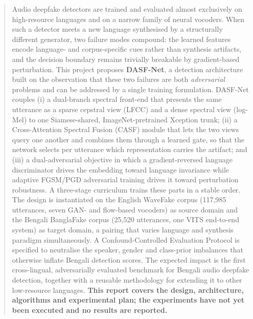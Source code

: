 \documentclass[conference]{IEEEtran}
\begin{document}
\maketitle

\begin{abstract}
Audio deepfake detectors are trained and evaluated almost exclusively on
high-resource languages and on a narrow family of neural vocoders. When such a
detector meets a new language synthesised by a structurally different
generator, two failure modes compound: the learned features encode language-
and corpus-specific cues rather than synthesis artifacts, and the decision
boundary remains trivially breakable by gradient-based perturbation. This
project proposes \textbf{DASF-Net}, a detection architecture built on the
observation that these two failures are both \emph{adversarial} problems and
can be addressed by a single training formulation. DASF-Net couples (i) a
dual-branch spectral front-end that presents the same utterance as a sparse
cepstral view (LFCC) and a dense spectral view (log-Mel) to one
Siamese-shared, ImageNet-pretrained Xception trunk; (ii) a Cross-Attention
Spectral Fusion (CASF) module that lets the two views query one another and
combines them through a learned gate, so that the network selects per
utterance which representation carries the artifact; and (iii) a
dual-adversarial objective in which a gradient-reversed language discriminator
drives the embedding toward language invariance while adaptive FGSM/PGD
adversarial training drives it toward perturbation robustness. A three-stage
curriculum trains these parts in a stable order. The design is instantiated on
the English WaveFake corpus (117,985 utterances, seven GAN- and flow-based
vocoders) as source domain and the Bengali BanglaFake corpus (25,520
utterances, one VITS end-to-end system) as target domain, a pairing that
varies language and synthesis paradigm simultaneously. A Confound-Controlled
Evaluation Protocol is specified to neutralise the speaker, gender and
class-prior imbalances that otherwise inflate Bengali detection scores. The
expected impact is the first cross-lingual, adversarially evaluated benchmark
for Bengali audio deepfake detection, together with a reusable methodology for
extending it to other low-resource languages. \textbf{This report covers the
design, architecture, algorithms and experimental plan; the experiments have
not yet been executed and no results are reported.}
\end{abstract}
\end{document}
